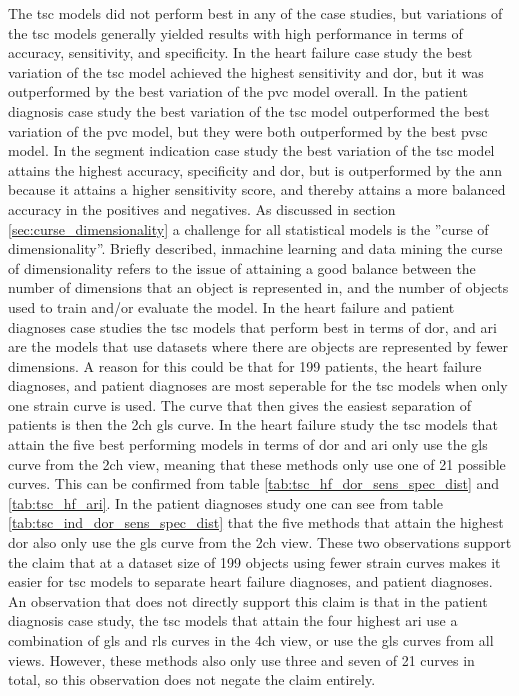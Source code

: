 The \acrshort{tsc} models did not perform best in any of the case studies, but variations of the \acrshort{tsc} models generally yielded results with high performance in terms of accuracy, sensitivity, and specificity. In the heart failure case study the best variation of the \acrshort{tsc} model achieved the highest sensitivity and \acrshort{dor}, but it was outperformed by the best variation of the \acrshort{pvc} model overall. In the patient diagnosis case study the best variation of the \acrshort{tsc} model outperformed the best variation of the \acrshort{pvc} model, but they were both outperformed by the best \acrshort{pvsc} model. In the segment indication case study the best variation of the \acrshort{tsc} model attains the highest accuracy, specificity and \acrshort{dor}, but is outperformed by the \acrshort{ann} because it attains a higher sensitivity score, and thereby attains a more balanced accuracy in the positives and negatives. \bigskip
As discussed in section \ref{sec:curse_dimensionality} a challenge for all statistical models is the ''curse of dimensionality''. Briefly described, inmachine learning and data mining the curse of dimensionality refers to the issue of attaining a good balance between the number of dimensions that an object is represented in, and the number of objects used to train and/or evaluate the model. In the heart failure and patient diagnoses case studies the \acrshort{tsc} models that perform best in terms of \acrshort{dor}, and \acrshort{ari} are the models that use datasets where there are objects are represented by fewer dimensions. A reason for this could be that for 199 patients, the heart failure diagnoses, and patient diagnoses are most seperable for the \acrshort{tsc} models when only one strain curve is used. The curve that then gives the easiest separation of patients is then the \acrshort{2ch} \acrshort{gls} curve. In the heart failure study the \acrshort{tsc} models that attain the five best performing models in terms of \acrshort{dor} and \acrshort{ari} only use the \acrshort{gls} curve from the \acrshort{2ch} view, meaning that these methods only use one of 21 possible curves. This can be confirmed from table \ref{tab:tsc_hf_dor_sens_spec_dist} and \ref{tab:tsc_hf_ari}. In the patient diagnoses study one can see from table \ref{tab:tsc_ind_dor_sens_spec_dist} that the five methods that attain the highest \acrshort{dor} also only use the \acrshort{gls} curve from the \acrshort{2ch} view. These two observations support the claim that at a dataset size of 199 objects using fewer strain curves makes it easier for \acrshort{tsc} models to separate heart failure diagnoses, and patient diagnoses. An observation that does not directly support this claim is that in the patient diagnosis case study, the \acrshort{tsc} models that attain the four highest \acrshort{ari} use a combination of \acrshort{gls} and \acrshort{rls} curves in the \acrshort{4ch} view, or use the \acrshort{gls} curves from all views. However, these methods also only use three and seven of 21 curves in total, so this observation does not negate the claim entirely. \bigskip
